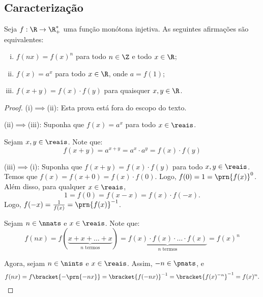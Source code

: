 \subsection{Caracterização}

\begin{theorem}
\label{theo:caracterizacao-funcao-exponencial}
Seja $f: \R \to \R_+^*$ uma função monótona injetiva. As
seguintes afirmações são equivalentes:
\begin{enumerate}[(i)]
  \item $f(nx) = f(x)^n$ para todo $n \in \Z$ e todo $x \in \R$;
  \item $f(x) = a^x$ para todo $x\in \R$, onde $a = f(1)$;
  \item $f(x+y) = f(x)\cdot f(y)$ para quaisquer $x, y \in \R$.
\end{enumerate}
\end{theorem}

\begin{proof}
  \item (i)$\implies$(ii): Esta prova está fora do escopo do texto.
  \item (ii)$\implies$(iii): Suponha que $f(x) = a^x$ para todo $x \in \reais$.
  
  Sejam $x,y \in \reais$. Note que:
  \[
      f(x+y)=a^{x+y}=a^x \cdot a^y = f(x)\cdot f(y)
  \]
  \item (iii)$\implies$(i): Suponha que $f(x+y) = f(x)\cdot f(y)$ para todo $x,y\in\reais$. 
  Temos que $f(x)=f(x+0) = f(x)\cdot f(0)$. 
  Logo, $f(0)=1=\prn{f(x)}^0$.
  Além disso, para qualquer $x\in\reais$,
  \[
      1=f(0)=f(x-x)=f(x)\cdot f(-x).
  \]
  Logo, $f(-x) = \frac{1}{f(x)} = \prn{f(x)}^{-1}$.

  Sejam $n \in \nnats$ e $x \in \reais$. Note que:
  \[
      f(nx)=f(\underbrace{x+x+\dots + x}_{\text{$n$ termos}}) = 
      \underbrace{f(x)\cdot f(x) \cdot \dots \cdot f(x)}_{\text{$n$ termos}} = f(x)^n
  \]

  Agora, sejam $n \in \nints$ e $x \in \reais$. Assim, $-n \in \pnats$, e
  \[
      f(nx) = f\bracket{-\prn{-nx}} = \bracket{f(-nx)}^{-1} = \bracket{f(x)^{-n}}^{-1} = f(x)^n.
  \]
\end{proof}